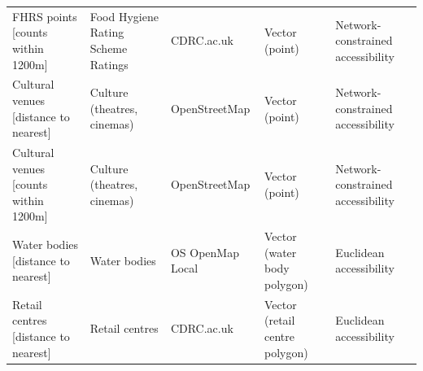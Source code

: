 \documentclass[fleqn,10pt]{wlscirep}
\begin{document}
\begin{longtable}{p{}p{}p{}p{}p{}}
                                                                        FHRS points [counts within 1200m] & Food Hygiene Rating Scheme Ratings  &                                                                 CDRC.ac.uk  &                    Vector (point)  &              Network-constrained accessibility  \\
                                                                    Cultural venues [distance to nearest] &        Culture (theatres, cinemas)  &                                                              OpenStreetMap  &                    Vector (point)  &              Network-constrained accessibility  \\
                                                                    Cultural venues [counts within 1200m] &        Culture (theatres, cinemas)  &                                                              OpenStreetMap  &                    Vector (point)  &              Network-constrained accessibility  \\
                                                                        Water bodies [distance to nearest] &                       Water bodies  &                                                           OS OpenMap Local  &       Vector (water body polygon)  &                        Euclidean accessibility  \\
                                                                    Retail centres [distance to nearest] &                     Retail centres  &                                                                 CDRC.ac.uk  &    Vector (retail centre polygon)  &                        Euclidean accessibility  \\
\end{longtable}
\tiny
\end{document}
